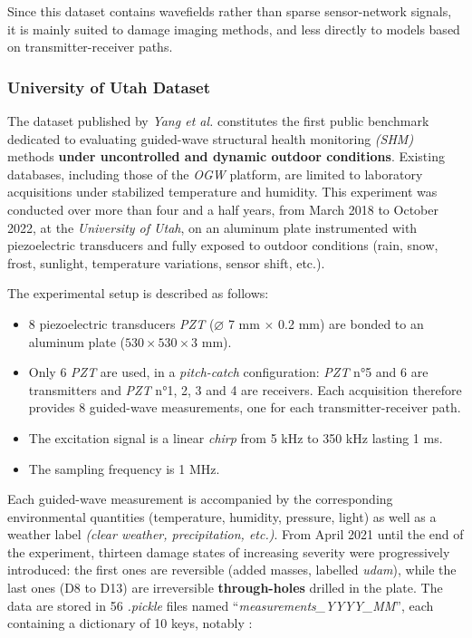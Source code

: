 \documentclass[12pt]{article}
\begin{document}
Since this dataset contains wavefields rather than sparse sensor-network signals, it is mainly suited to damage imaging methods, and less directly to models based on transmitter-receiver paths.
 
\subsubsection{University of Utah Dataset}
 
The dataset published by \textit{Yang et al.} \cite{Yang2025} constitutes the first public benchmark dedicated to evaluating guided-wave structural health monitoring \textit{(SHM)} methods \textbf{under uncontrolled and dynamic outdoor conditions}. Existing databases, including those of the \textit{OGW} platform, are limited to laboratory acquisitions under stabilized temperature and humidity. This experiment was conducted over more than four and a half years, from March 2018 to October 2022, at the \textit{University of Utah}, on an aluminum plate instrumented with piezoelectric transducers and fully exposed to outdoor conditions (rain, snow, frost, sunlight, temperature variations, sensor shift, etc.).
 
The experimental setup is described as follows:
 
\begin{itemize}[itemsep=8pt]
 
    \item 8 piezoelectric transducers \textit{PZT} ($\varnothing$ 7 mm $\times$ 0.2 mm) are bonded to an aluminum plate ($530 \times 530 \times 3$ mm).
 
    \item Only 6 \textit{PZT} are used, in a \textit{pitch-catch} configuration: \textit{PZT} n°5 and 6 are transmitters and \textit{PZT} n°1, 2, 3 and 4 are receivers. Each acquisition therefore provides 8 guided-wave measurements, one for each transmitter-receiver path.
 
    \item The excitation signal is a linear \textit{chirp} from 5 kHz to 350 kHz lasting 1 ms.
 
    \item The sampling frequency is 1 MHz.
 
\end{itemize}
 
Each guided-wave measurement is accompanied by the corresponding environmental quantities (temperature, humidity, pressure, light) as well as a weather label \textit{(clear weather, precipitation, etc.)}. From April 2021 until the end of the experiment, thirteen damage states of increasing severity were progressively introduced: the first ones are reversible (added masses, labelled \textit{udam}), while the last ones (D8 to D13) are irreversible \textbf{through-holes} drilled in the plate. The data are stored in 56 \textit{.pickle} files named ``\textit{measurements\_YYYY\_MM}'', each containing a dictionary of 10 keys, notably :
 
\end{document}
